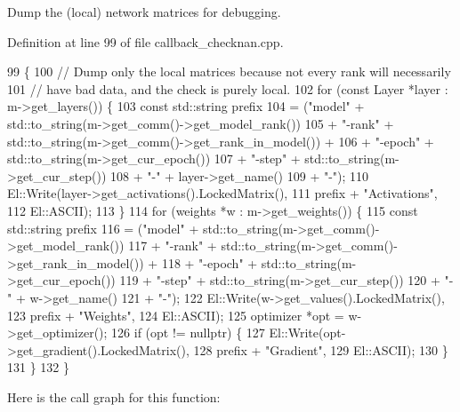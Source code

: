 Dump the (local) network matrices for debugging. 

Definition at line 99 of file callback\+\_\+checknan.\+cpp.


\begin{DoxyCode}
99                                                    \{
100   \textcolor{comment}{// Dump only the local matrices because not every rank will necessarily}
101   \textcolor{comment}{// have bad data, and the check is purely local.}
102   \textcolor{keywordflow}{for} (\textcolor{keyword}{const} Layer *layer : m->get\_layers()) \{
103     \textcolor{keyword}{const} std::string prefix
104       = (\textcolor{stringliteral}{"model"} + std::to\_string(m->get\_comm()->get\_model\_rank())
105          + \textcolor{stringliteral}{"-rank"} + std::to\_string(m->get\_comm()->get\_rank\_in\_model()) +
106          + \textcolor{stringliteral}{"-epoch"} + std::to\_string(m->get\_cur\_epoch())
107          + \textcolor{stringliteral}{"-step"} + std::to\_string(m->get\_cur\_step())
108          + \textcolor{stringliteral}{"-"} + layer->get\_name()
109          + \textcolor{stringliteral}{"-"});
110     El::Write(layer->get\_activations().LockedMatrix(),
111               prefix + \textcolor{stringliteral}{"Activations"},
112               El::ASCII);
113   \}
114   \textcolor{keywordflow}{for} (weights *w : m->get\_weights()) \{
115     \textcolor{keyword}{const} std::string prefix
116       = (\textcolor{stringliteral}{"model"} + std::to\_string(m->get\_comm()->get\_model\_rank())
117          + \textcolor{stringliteral}{"-rank"} + std::to\_string(m->get\_comm()->get\_rank\_in\_model()) +
118          + \textcolor{stringliteral}{"-epoch"} + std::to\_string(m->get\_cur\_epoch())
119          + \textcolor{stringliteral}{"-step"} + std::to\_string(m->get\_cur\_step())
120          + \textcolor{stringliteral}{"-"} + w->get\_name()
121          + \textcolor{stringliteral}{"-"});
122     El::Write(w->get\_values().LockedMatrix(),
123               prefix + \textcolor{stringliteral}{"Weights"},
124               El::ASCII);
125     optimizer *opt = w->get\_optimizer();
126     \textcolor{keywordflow}{if} (opt != \textcolor{keyword}{nullptr}) \{
127       El::Write(opt->get\_gradient().LockedMatrix(),
128                 prefix + \textcolor{stringliteral}{"Gradient"},
129                 El::ASCII);
130     \}
131   \}
132 \}
\end{DoxyCode}
Here is the call graph for this function\+:\nopagebreak
